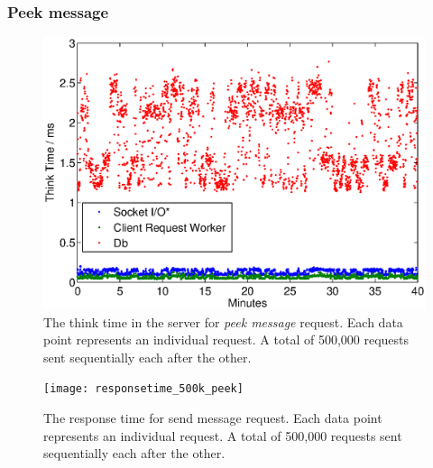 \documentclass{article}
\begin{document}
            \subsubsection{Peek message}
                \begin{figure}[H]
                    \includegraphics[scale=0.50]{thinktime_500k_peek}
                    \caption{The think time in the server for \textit{peek message} request. Each data point represents an individual request. A total of 500,000 requests sent sequentially each after the other.}
                    \label{fig:thinktime_500k_peek}
                \end{figure}

                \begin{figure}[H]
                    \texttt{[image: responsetime\_500k\_peek]}
                    \caption{The response time for send message request. Each data point represents an individual request. A total of 500,000 requests sent sequentially each after the other.}
                    \label{fig:responsetime_500k_peek}
                \end{figure}
                
\end{document}
